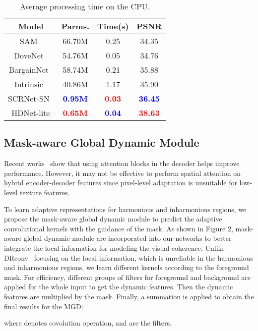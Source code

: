 \documentclass[sigconf]{acmart}
\begin{document}
\begin{table}[t]
	\centering
	\begin{tabular}{cccc}
		\toprule
		Model&Parms.&Time(s)&PSNR\\\midrule
		SAM~\cite{SSAM}&66.70M&0.25&34.35 \\
		DoveNet~\cite{DoveNet}&54.76M&0.05&34.76\\         BargainNet~\cite{Bargainnet}&58.74M&0.21&35.88 \\ 
		Intrinsic~\cite{GuoZJGZ21} &40.86M&1.17&35.90 \\
		SCRNet-SN~\cite{liang2021spatial}&\textbf{\textcolor{blue}{0.95M}} &\textbf{\textcolor{red}{0.03}}&\textbf{\textcolor{blue}{36.45}}\\
		\midrule
		HDNet-lite&\textbf{\textcolor{red}{0.65M}}&\textbf{\textcolor{blue}{0.04}}&\textbf{\textcolor{red}{38.63}}\\
		\bottomrule
	\end{tabular}
	\caption{Average processing time on the CPU.}
\end{table}


\subsection{Mask-aware Global Dynamic Module}
Recent works~\cite{RAIN,Bargainnet,SSAM} show that using attention blocks in the decoder helps improve performance. However, it may not be effective to perform spatial attention on hybrid encoder-decoder features since pixel-level adaptation is unsuitable for low-level texture features. 

To learn adaptive representations for harmonious and inharmonious regions, we propose the mask-aware global dynamic module to predict the adaptive convolutional kernels with the guidance of the mask. As shown in Figure 2, mask-aware global dynamic module are incorporated into our networks to better integrate the local information for modeling the visual coherence. Unlike DRconv~\cite{drconv} focusing on the local information, which is unreliable in the harmonious and inharmonious regions, we learn different kernels according to the foreground mask. For efficiency, different groups of filters for foreground and background are applied for the whole input to get the dynamic features. Then the dynamic features are multiplied by the mask. Finally, a summation is applied to obtain the final results for the MGD:

where  denotes covolution operation,  and  are the filters.
\end{document}
